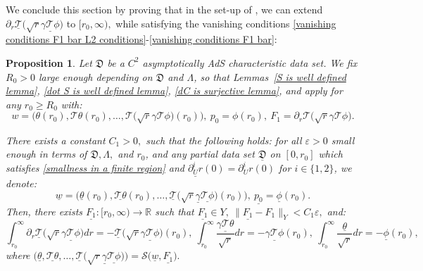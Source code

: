 \documentclass[11pt]{article}
\newtheorem{proposition}{Proposition}[section]
\numberwithin{equation}{section}
\begin{document}
    We conclude this section by proving that in the set-up of , we can extend $\partial_r\underline{\mathcal{T}}\big(\sqrt{r}\underline{\gamma\mathcal{T}\phi}\big)$ to $[r_0,\infty),$ while satisfying the vanishing conditions \eqref{vanishing conditions F1 bar L2 conditions}-\eqref{vanishing conditions F1 bar}:
\begin{proposition}\label{existence of F1 proposition}
	Let $\mathfrak{D}$ be a $C^2$ asymptotically AdS characteristic data set. We fix $R_0>0$ large enough depending on $\mathfrak{D}$ and $\Lambda$, so that Lemmas~\ref{S is well defined lemma}, \ref{dot S is well defined lemma}, \ref{dC is surjective lemma}, and  apply for any $r_0\geq R_0$ with:
    \begin{equation}\label{w p0 F1}
        w=\big(\theta(r_0),\mathcal{T}\theta(r_0),\ldots,\mathcal{T}\big(\sqrt{r}\gamma\mathcal{T}\phi\big)(r_0)\big),\ p_0=\phi(r_0), \  F_1=\partial_r\mathcal{T}\big(\sqrt{r}\gamma\mathcal{T\phi}\big).
    \end{equation}

    There exists a constant $C_1>0,$ such that the following holds: for all $\varepsilon>0$ small enough in terms of $\mathfrak{D},\Lambda,$ and $r_0$, and any partial data set $\underline{\mathfrak{D}}$ on $[0,r_0]$ which satisfies \eqref{smallness in a finite region} and $\underline{\partial_U^ir}(0)=\partial_U^ir(0)$ for $i\in\{1,2\}$, we denote:
    \[\underline{w}=\big(\underline{\theta}(r_0),\underline{\mathcal{T}\theta}(r_0),\ldots,\underline{\mathcal{T}}\big(\sqrt{r}\underline{\gamma}\underline{\mathcal{T}\phi}\big)(r_0)\big),\ \underline{p_0}=\underline{\phi}(r_0).\]
    Then, there exists $\underline{F_1}:[r_0,\infty)\rightarrow\mathbb{R}$ such that $\underline{F_1}\in Y,\ \|\underline{F_1}-F_1\|_{Y}<C_1\varepsilon,$ and: 
    \begin{equation}\label{vanishing conditions eq}
    \int_{r_0}^{\infty}\partial_r\underline{\mathcal{T}}\big(\sqrt{r}\underline{\gamma\mathcal{T}\phi}\big)dr=-\underline{\mathcal{T}}\big(\sqrt{r}\underline{\gamma\mathcal{T}\phi}\big)(r_0),\ \int_{r_0}^{\infty}\frac{\underline{\gamma\mathcal{T}\theta}}{\sqrt{r}}dr=-\underline{\gamma\mathcal{T}\phi}(r_0),\ \int_{r_0}^{\infty}\frac{\underline{\theta}}{\sqrt{r}}dr=-\underline{\phi}(r_0),
    \end{equation}
where $\big(\underline{\theta},\underline{\mathcal{T}\theta},\ldots,\underline{\mathcal{T}}\big(\sqrt{r}\underline{\gamma}\underline{\mathcal{T}\phi}\big)\big)=\mathcal{S}\big(\underline{w},\underline{F_1}\big).$
\end{proposition}
\end{document}
